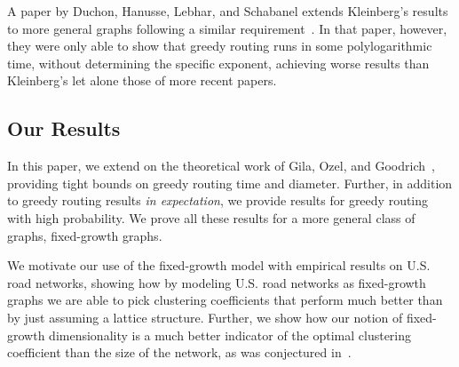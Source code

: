 A paper by Duchon, Hanusse, Lebhar, and Schabanel extends Kleinberg's results to
more general graphs following a similar requirement~\cite{duchon2006could}.
In that paper, however, they were only able to show that greedy routing runs in
some polylogarithmic time, without determining the specific exponent, achieving
worse results than Kleinberg's let alone those of more recent papers.




\subsection{Our Results}

In this paper, we extend on the theoretical work 
of Gila, Ozel, and Goodrich~\cite{gila2023highway},
providing tight bounds on greedy routing time and diameter.
Further, in addition to greedy routing results \textit{in expectation}, we
provide results for greedy routing with high probability.
We prove all these results for a more general class of graphs, fixed-growth
graphs.

We motivate our use of the fixed-growth model with empirical results on U.S.
road networks, showing how by modeling U.S. road networks as fixed-growth graphs
we are able to pick clustering coefficients that perform much better than by
just assuming a lattice structure.
Further, we show how our notion of fixed-growth dimensionality is a much better
indicator of the optimal clustering coefficient than the size of the network, as
was conjectured in~\cite{goodrich2022modeling}.

